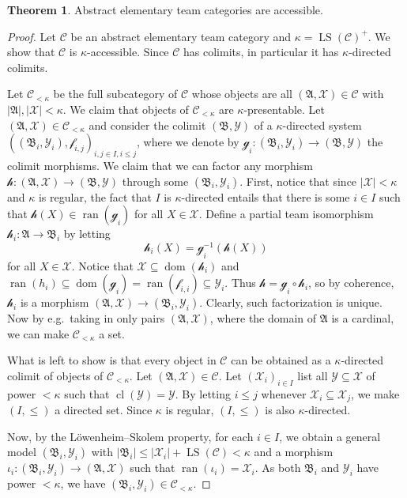 \documentclass[a4paper]{amsart}
\theoremstyle{definition}
\newtheorem{theorem}[definition]{Theorem}
\theoremstyle{remark}
\newcommand{\A}{\mathcal{A}}
\newcommand{\B}{\mathcal{B}}
\DeclareMathOperator{\dom}{dom}
\DeclareMathOperator{\ran}{ran}
\newcommand{\Y}{\mathcal{Y}}
\newcommand{\X}{\mathcal{X}}
\DeclareMathOperator{\LS}{LS}
\theoremstyle{definition}
\renewcommand{\A}{\mathfrak{A}}
\renewcommand{\B}{\mathfrak{B}}
\newcommand{\f}{\mathcal{f}}
\newcommand{\g}{\mathcal{g}}
\newcommand{\h}{\mathcal{h}}
\DeclareMathOperator{\cl}{cl}
\begin{document}
\begin{theorem}\label{theorem:aetc.accessible}
    Abstract elementary team categories are accessible.
\end{theorem}
\begin{proof}
    Let $\mathcal C$ be an abstract elementary team category and $\kappa = \LS(\mathcal C)^+$. We show that $\mathcal C$ is $\kappa$-accessible. Since $\mathcal C$ has colimits,  in particular it has $\kappa$-directed colimits.
    
    Let $\mathcal C_{<\kappa}$ be the full subcategory of $\mathcal C$ whose objects are all $(\A,\X)\in\mathcal C$ with $|\A|,|\X|<\kappa$. We claim that objects of $\mathcal C_{<\kappa}$ are $\kappa$-presentable. Let $(\A,\X)\in\mathcal C_{<\kappa}$ and consider the colimit $(\B,\Y)$ of a $\kappa$-directed system $((\B_i,\Y_i),\f_{i,j})_{i,j\in I,i\leq j}$, where we denote by $\g_i\colon(\B_i,\Y_i)\to(\B,\Y)$ the colimit morphisms. We claim that we can factor any morphism $\h\colon(\A,\X)\to(\B,\Y)$ through some $(\B_i,\Y_i)$. First, notice that since $|\X|< \kappa$ and $\kappa$ is regular, the fact that $I$ is $\kappa$-directed entails that there is some $i\in I$ such that $\h(X)\in\ran(\g_i)$ for all $X\in \X$. Define a partial team isomorphism $\h_i\colon\A\to\B_i$ by letting
    \[
        \h_i(X) = \g_i^{-1}(\h(X))
    \]
    for all $X\in\X$. Notice that $\X\subseteq\dom(\h_i)$ and $\ran(h_i)\subseteq\dom(\g_i) = \ran(\f_{i,i})\subseteq \Y_i$. Thus $\h=\g_i\circ\h_i$, so by coherence, $\h_i$ is a morphism $(\A,\X)\to(\B_i,\Y_i)$. Clearly, such factorization is unique. Now by e.g.\ taking in only pairs $(\A,\X)$, where the domain of $\A$ is a cardinal, we can make $\mathcal C_{<\kappa}$ a set.

    What is left to show is that every object in $\mathcal C$ can be obtained as a $\kappa$-directed colimit of objects of $\mathcal C_{<\kappa}$. Let $(\A,\X)\in\mathcal C$. Let $(\X_i)_{i\in I}$ list all $\Y\subseteq\X$ of power $<\kappa$ such that $\cl(\Y)=\Y$. By letting $i\leq j$ whenever $\X_i\subseteq\X_j$, we make $(I,\leq)$ a directed set. Since $\kappa$ is regular, $(I,\leq)$ is also $\kappa$-directed.
    
    Now, by the Löwenheim--Skolem property, for each $i\in I$, we obtain a general model $(\B_i,\Y_i)$ with $|\B_i|\leq|\X_i|+\LS(\mathcal C) < \kappa$ and a morphism $\iota_i\colon(\B_i,\Y_i)\to(\A,\X)$ such that $\ran(\iota_i)=\X_i$. As both $\B_i$ and $\Y_i$ have power $<\kappa$, we have $(\B_i,\Y_i)\in\mathcal C_{<\kappa}$.
        

\end{proof}
\end{document}
